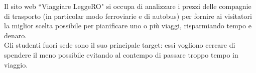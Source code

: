 \documentclass[main.tex]{subfiles}
\begin{document}
Il sito web ``Viaggiare LeggeRO" si occupa di analizzare i prezzi delle compagnie di trasporto (in particolar modo ferroviarie e di autobus) per fornire
ai visitatori la miglior scelta possibile per pianificare uno o più viaggi, risparmiando tempo e denaro.\\
Gli studenti fuori sede sono il suo principale target: essi vogliono cercare di spendere il meno possibile evitando al contempo di passare troppo tempo in viaggio.
\end{document}
